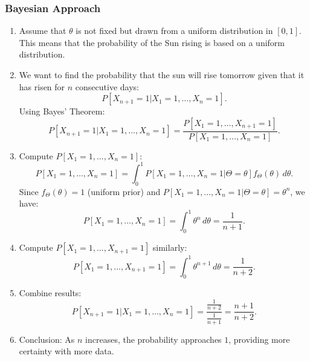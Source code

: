\subsubsection{Bayesian Approach}
\begin{example}
    \begin{enumerate}
        \item Assume that $\theta$ is not fixed but drawn from a uniform distribution in $[0, 1]$. This means that the probability of the Sun rising is based on a uniform distribution.
        \item We want to find the probability that the sun will rise tomorrow given that it has risen for $n$ consecutive days:
        \[
        P[X_{n+1} = 1 | X_1 = 1, \dots, X_n = 1].
        \]
        Using Bayes' Theorem:
        \[
        P[X_{n+1} = 1 | X_1 = 1, \dots, X_n = 1] = \frac{P[X_1 = 1, \dots, X_{n+1} = 1]}{P[X_1 = 1, \dots, X_n = 1]}.
        \]
        \item Compute $P[X_1 = 1, \dots, X_n = 1]$:
        \[
        P[X_1 = 1, \dots, X_n = 1] = \int_0^1 P[X_1 = 1, \dots, X_n = 1 | \Theta = \theta] f_\Theta(\theta) \, d\theta.
        \]
        Since $f_\Theta(\theta) = 1$ (uniform prior) and $P[X_1 = 1, \dots, X_n = 1 | \Theta = \theta] = \theta^n$, we have:
        \[
        P[X_1 = 1, \dots, X_n = 1] = \int_0^1 \theta^n \, d\theta = \frac{1}{n+1}.
        \]
        \item Compute $P[X_1 = 1, \dots, X_{n+1} = 1]$ similarly:
        \[
        P[X_1 = 1, \dots, X_{n+1} = 1] = \int_0^1 \theta^{n+1} \, d\theta = \frac{1}{n+2}.
        \]
        \item Combine results:
        \[
        P[X_{n+1} = 1 | X_1 = 1, \dots, X_n = 1] = \frac{\frac{1}{n+2}}{\frac{1}{n+1}} = \frac{n+1}{n+2}.
        \]
        \item Conclusion: As $n$ increases, the probability approaches $1$, providing more certainty with more data.
    \end{enumerate}
\end{example}
